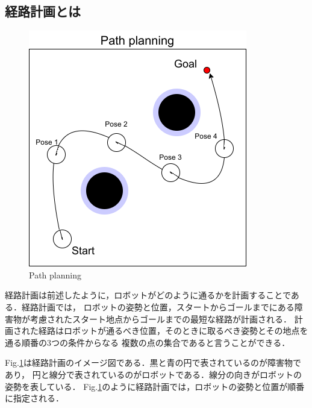 
\subsection{経路計画とは}

\begin{figure}[hbtp]
  \centering
 \includegraphics[keepaspectratio, scale=0.8]
      {images/png/PathPlanning.drawio.png}
 \caption{Path planning}
 \label{Fig:PathPlanning}
\end{figure}

経路計画は前述したように，ロボットがどのように通るかを計画することである．経路計画では，
ロボットの姿勢と位置，スタートからゴールまでにある障害物が考慮されたスタート地点からゴールまでの最短な経路が計画される．
計画された経路はロボットが通るべき位置，そのときに取るべき姿勢とその地点を通る順番の3つの条件からなる
複数の点の集合であると言うことができる．

Fig.\ref{Fig:PathPlanning}は経路計画のイメージ図である．黒と青の円で表されているのが障害物であり，
円と線分で表されているのがロボットである．線分の向きがロボットの姿勢を表している．
Fig.\ref{Fig:PathPlanning}のように経路計画では，ロボットの姿勢と位置が順番に指定される．
\newpage
